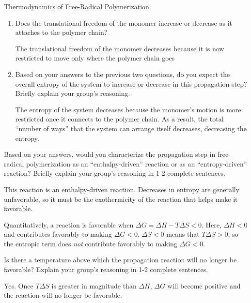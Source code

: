 \begin{activity}{Thermodynamics of Free-Radical Polymerization}
\begin{ctqs}
\begin{enumerate}
			\item Does the translational freedom of the monomer increase or decrease as it attaches to the polymer chain?
				
				\begin{solution}[0.5in]
					The translational freedom of the monomer decreases because it is now restricted to move only where the polymer chain goes
				\end{solution}
			
			\item Based on your answers to the previous two questions, do you expect the overall entropy of the system to increase or decrease in this propagation step?  Briefly explain your group's reasoning.
				
				\begin{solution}[1.25in]
					The entropy of the system decreases because the monomer's motion is more restricted once it connects to the polymer chain.  As a result, the total ``number of ways'' that the system can arrange itself decreases, decreasing the entropy.
				\end{solution}
			
		\end{enumerate}
	
	\question Based on your answers, would you characterize the propagation step in free-radical polymerization as an ``enthalpy-driven'' reaction or as an ``entropy-driven'' reaction?  Briefly explain your group's reasoning in 1-2 complete sentences.
	
		\begin{solution}[1.25in]
			This reaction is an enthalpy-driven reaction.  Decreases in entropy are generally unfavorable, so it must be the exothermicity of the reaction that helps make it favorable.
			
			Quantitatively, a reaction is favorable when $\Delta G = \Delta H - T\Delta S < 0$.  Here, $\Delta H < 0$ and contributes favorably to making $\Delta G < 0$.  $\Delta S < 0$ means that $T \Delta S > 0$, so the entropic term does \emph{not} contribute favorably to making $\Delta G < 0$.
		\end{solution}
		
	\question Is there a temperature above which the propagation reaction will no longer be favorable?  Explain your group's reasoning in 1-2 complete sentences.\label{\labelbase:ctq:ceilingconcept}
	
		\begin{solution}[1.25in]
			Yes.  Once $T\Delta S$ is greater in magnitude than $\Delta H$, $\Delta G$ will become positive and the reaction will no longer be favorable.
			

\end{solution}
\end{ctqs}
\end{activity}
